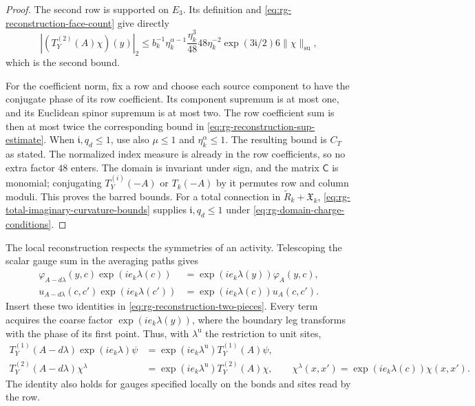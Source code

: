 \begin{proof}
The second row is supported on $E_3$. Its definition and
\eqref{eq:rg-reconstruction-face-count} give directly
\[
 |(T_Y^{(2)}(A)\chi)(y)|_2
 \le b_k^{-1}\eta_k^{\alpha-1}\frac{\eta_k^3}{48}
            48\eta_k^{-2}\exp(3\mathfrak i/2)6\|\chi\|_{\mathrm{su}},
\]
which is the second bound.

For the coefficient norm, fix a row and choose each source
component to have the conjugate phase of its row coefficient.
Its component supremum is at most one, and its Euclidean
spinor supremum is at most two. The row coefficient sum is
then at most twice the corresponding bound in
\eqref{eq:rg-reconstruction-sup-estimate}. When
$\mathfrak i,q_d\le1$, use also $\mu\le1$ and $\eta_k^\alpha\le1$.
The resulting bound is $C_T$ as stated. The normalized index
measure is already in the row coefficients, so no extra
factor $48$ enters. The domain is invariant under sign, and
the matrix $\mathsf C$ is monomial; conjugating $T_Y^{(i)}(-A)$
or $T_k(-A)$ by it permutes row and column moduli.
This proves the barred bounds.
For a total connection in $\widetilde R_k+\mathfrak X_k$,
\eqref{eq:rg-total-imaginary-curvature-bounds} supplies
$\mathfrak i,q_d\le1$ under
\eqref{eq:rg-domain-charge-conditions}.
\end{proof}

The local reconstruction respects the symmetries of an activity.
Telescoping the scalar gauge sum in the averaging paths gives
\[
 \begin{aligned}
 \varphi_{A-d\lambda}(y,c)\exp(ie_k\lambda(c))
       &=\exp(ie_k\lambda(y))\varphi_A(y,c),\\
 u_{A-d\lambda}(c,c')\exp(ie_k\lambda(c'))
       &=\exp(ie_k\lambda(c))u_A(c,c').
 \end{aligned}
\]
Insert these two identities in
\eqref{eq:rg-reconstruction-two-pieces}. Every term acquires
the coarse factor $\exp(ie_k\lambda(y))$, where the boundary
leg transforms with the phase of its first point. Thus, with
$\lambda^{\mathrm u}$ the restriction to unit sites,
\begin{equation}\label{eq:rg-reconstruction-gauge-covariance}
 \begin{split}
 T_Y^{(1)}(A-d\lambda)\exp(ie_k\lambda)\psi
      &=\exp(ie_k\lambda^{\mathrm u})T_Y^{(1)}(A)\psi,\\
 T_Y^{(2)}(A-d\lambda)\chi^\lambda
      &=\exp(ie_k\lambda^{\mathrm u})T_Y^{(2)}(A)\chi,
 \qquad\chi^\lambda(x,x')=\exp(ie_k\lambda(c))\chi(x,x').
 \end{split}
\end{equation}
The identity also holds for gauges specified locally on the
bonds and sites read by the row.

